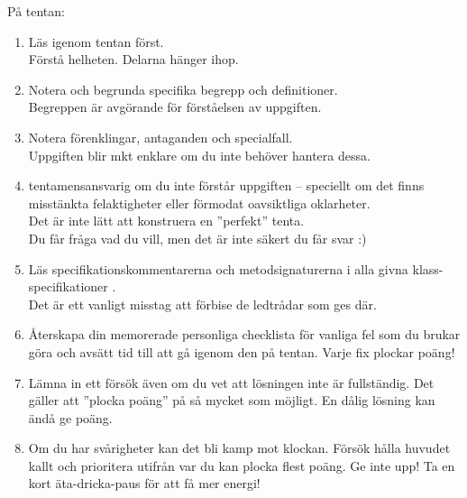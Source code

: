 \begin{Slide}{På tentan:} \SlideFontTiny
\begin{enumerate}
\item Läs igenom  tentan först. \\  Förstå helheten. Delarna hänger ihop.
\item Notera och begrunda specifika begrepp och definitioner. \\  Begreppen är avgörande för förståelsen av uppgiften.
\item Notera förenklingar, antaganden och specialfall. \\  Uppgiften blir mkt enklare om du inte behöver hantera dessa.
\item {} tentamensansvarig om du inte förstår uppgiften -- speciellt om det finns misstänkta felaktigheter eller förmodat oavsiktliga oklarheter. \\  Det är inte lätt att konstruera en ''perfekt'' tenta. \\ Du får fråga vad du vill, men det är inte säkert du får svar :)
\item Läs specifikationskommentarerna och metodsignaturerna i alla givna klass-specifikationer . \\  Det är ett vanligt misstag att förbise de ledtrådar som ges där.
\item Återskapa din memorerade personliga checklista för vanliga fel som du brukar göra och avsätt tid till att gå igenom den på tentan. Varje fix plockar poäng!
\item Lämna in ett försök även om du vet att lösningen inte är fullständig. Det gäller att ''plocka poäng'' på så mycket som möjligt. En dålig lösning kan ändå ge poäng.

\item Om du har svårigheter kan det bli kamp mot klockan. Försök hålla huvudet kallt och prioritera utifrån var du kan plocka flest poäng. Ge inte upp! Ta en kort äta-dricka-paus för att få mer energi!

\end{enumerate}
\end{Slide}

\ifkompendium\else

